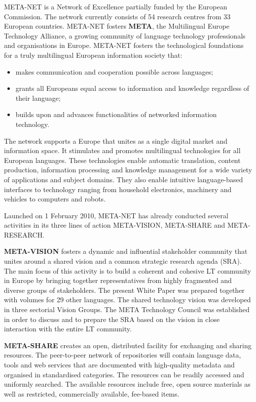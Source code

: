 \begin{multicols}{2}
META-NET is a Network of Excellence partially funded by the European Commission. The network currently consists of 54 research centres from 33 European countries. META-NET fosters \textbf{META}, the Multilingual Europe Technology Alliance, a growing community of language technology professionals and organisations in Europe.  META-NET fosters the technological foundations for a truly multilingual European information society that:

\begin{itemize}
\item makes communication and cooperation possible across languages;
\item grants all Europeans equal access  to information and knowledge regardless of their language;
\item builds upon and advances functionalities of networked information technology.
\end{itemize}

The network supports a Europe  that unites as a single digital market and information space. It stimulates and promotes multilingual technologies for all European languages. These technologies enable automatic translation, content production, information processing and knowledge management for a wide variety of applications and subject domains. They also enable intuitive language-based interfaces to technology ranging from household electronics, machinery and vehicles to computers and robots.

Launched on 1 February 2010,   META-NET has already conducted several activities in its three lines of action META-VISION, META-SHARE and META-RESEARCH.

\textbf{META-VISION} fosters a dynamic and influential stakeholder community that unites around a shared vision and a common strategic research agenda (SRA). The main focus of this activity is to build a coherent and cohesive LT community in Europe by bringing together representatives from highly fragmented and diverse groups of stakeholders. The present White Paper was prepared together with volumes for 29 other languages. The shared technology vision was developed in three sectorial Vision Groups. The META Technology Council was established in order to discuss and to prepare the SRA based on the vision in close interaction with the entire LT community.

\textbf{META-SHARE} creates an open, distributed facility for exchanging and sharing resources. The peer-to-peer network of repositories will contain language data, tools and web services that are documented with high-quality metadata and organised in standardised categories. The resources can be readily accessed and uniformly searched. The available resources include free, open source materials as well as restricted, commercially available, fee-based items. 


\end{multicols}
